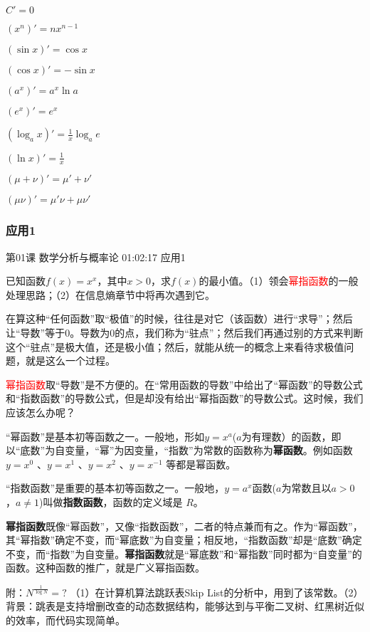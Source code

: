 \documentclass[UTF8]{ctexbook}
\begin{document}
$C'=0$

$(x^{n})'=nx^{n-1}$

$(\sin x)'=\cos x$

$(\cos x)'=-\sin x$

$(a^{x})'=a^{x}\ln a$

$(e^{x})'=e^{x}$

$(\log_{a}{x})'=\frac{1}{x}\log_{a}{e}$

$(\ln x)'=\frac{1}{x}$

$(\mu+\nu)'=\mu'+\nu'$

$(\mu\nu)'=\mu'\nu+\mu\nu'$

\subsubsection{应用1}

第01课 数学分析与概率论 01:02:17 应用1

已知函数$f(x)=x^{x}$，其中$x>0$，求$f(x)$的最小值。（1）领会\textcolor{red}{幂指函数}的一般处理思路；（2）在信息熵章节中将再次遇到它。



在算这种“任何函数”取“极值”的时候，往往是对它（该函数）进行“求导”；然后让“导数”等于0。导数为0的点，我们称为“驻点”；然后我们再通过别的方式来判断这个“驻点”是极大值，还是极小值；然后，就能从统一的概念上来看待求极值问题，就是这么一个过程。

\textcolor{red}{幂指函数}取“导数”是不方便的。在“常用函数的导数”中给出了“幂函数”的导数公式和“指数函数”的导数公式，但是却没有给出“幂指函数”的导数公式。这时候，我们应该怎么办呢？

“幂函数”是基本初等函数之一。一般地，形如$y=x^{a}$($a$为有理数）的函数，即以“底数”为自变量，“幂”为因变量，“指数”为常数的函数称为\textbf{幂函数}。例如函数$y=x^{0}$ 、$y=x^{1}$ 、$y=x^{2}$ 、$y=x^{-1}$ 等都是幂函数。

“指数函数”是重要的基本初等函数之一。一般地，$y=a^{x}$函数($a$为常数且以$a>0$，$a \neq 1$)叫做\textbf{指数函数}，函数的定义域是 $R$。

\textbf{幂指函数}既像“幂函数”，又像“指数函数”，二者的特点兼而有之。作为“幂函数”，其“幂指数”确定不变，而“幂底数”为自变量；相反地，“指数函数”却是“底数”确定不变，而“指数”为自变量。\textbf{幂指函数}就是“幂底数”和“幂指数”同时都为“自变量”的函数。这种函数的推广，就是广义幂指函数。

附：$N^{\frac{1}{\log {N}}}=?$ （1）在计算机算法跳跃表Skip List的分析中，用到了该常数。（2）背景：跳表是支持增删改查的动态数据结构，能够达到与平衡二叉树、红黑树近似的效率，而代码实现简单。
\end{document}
